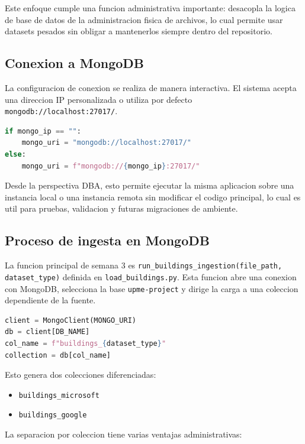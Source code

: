 \documentclass[12pt]{article}
\begin{document}
Este enfoque cumple una funcion administrativa importante: desacopla la logica de base de datos de la administracion fisica de archivos, lo cual permite usar datasets pesados sin obligar a mantenerlos siempre dentro del repositorio.

\subsection{Conexion a MongoDB}

La configuracion de conexion se realiza de manera interactiva. El sistema acepta una direccion IP personalizada o utiliza por defecto \texttt{mongodb://localhost:27017/}.

\begin{lstlisting}[style=basicstyle,language=Python]
if mongo_ip == "":
    mongo_uri = "mongodb://localhost:27017/"
else:
    mongo_uri = f"mongodb://{mongo_ip}:27017/"
\end{lstlisting}

Desde la perspectiva DBA, esto permite ejecutar la misma aplicacion sobre una instancia local o una instancia remota sin modificar el codigo principal, lo cual es util para pruebas, validacion y futuras migraciones de ambiente.

\subsection{Proceso de ingesta en MongoDB}

La funcion principal de semana 3 es \texttt{run\_buildings\_ingestion(file\_path, dataset\_type)} definida en \texttt{load\_buildings.py}. Esta funcion abre una conexion con MongoDB, selecciona la base \texttt{upme-project} y dirige la carga a una coleccion dependiente de la fuente.

\begin{lstlisting}[style=basicstyle,language=Python]
client = MongoClient(MONGO_URI)
db = client[DB_NAME]
col_name = f"buildings_{dataset_type}"
collection = db[col_name]
\end{lstlisting}

Esto genera dos colecciones diferenciadas:

\begin{itemize}[leftmargin=*]
    \item \texttt{buildings\_microsoft}
    \item \texttt{buildings\_google}
\end{itemize}

La separacion por coleccion tiene varias ventajas administrativas:
\end{document}
